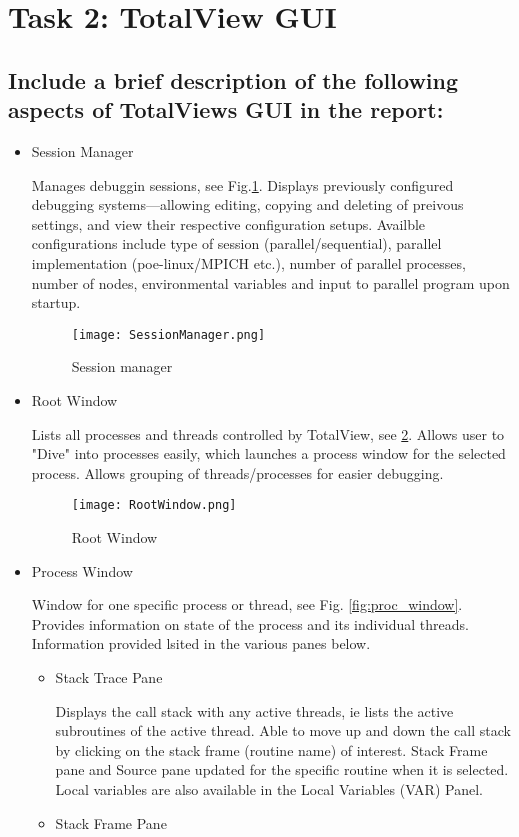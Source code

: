 \documentclass{article}
\begin{document}
\section{Task 2: TotalView GUI}

\subsection{Include a brief description of the following aspects of TotalViews GUI in the report:}
\begin{itemize}
	\item Session Manager
	
	Manages debuggin sessions, see Fig.\ref{fig:sess_manager}. Displays previously configured debugging systems---allowing editing, copying and deleting of preivous settings, and view their respective configuration setups. Availble configurations include type of session (parallel/sequential), parallel implementation (poe-linux/MPICH etc.), number of parallel processes, number of nodes, environmental variables and input to parallel program upon startup.
	\begin{figure}[p] %
			\texttt{[image: SessionManager.png]}
		\caption{Session manager}
		\label{fig:sess_manager}
	\end{figure}
	\item Root Window
	
	Lists all processes and threads controlled by TotalView, see \ref{fig:root_window}. Allows user to "Dive" into processes easily, which launches a process window for the selected process. Allows grouping of threads/processes for easier debugging.
		\begin{figure}[p] %
			\texttt{[image: RootWindow.png]}
		\caption{Root Window}
		\label{fig:root_window}
	\end{figure}
	\item Process Window
	
	Window for one specific process or thread, see Fig. \ref{fig:proc_window}. Provides information on state of the process and its individual threads. Information provided lsited in the various panes below.
	\begin{itemize}
		\item Stack Trace Pane
		
		Displays the call stack with any active threads, ie lists the active subroutines of the active thread. Able to move up and down the call stack by clicking on the stack frame (routine name) of interest. Stack Frame pane and Source pane updated for the specific routine when it is selected. Local variables are also available in the Local Variables (VAR) Panel.
		\item Stack Frame Pane
		

\end{itemize}
\end{itemize}
\end{document}

